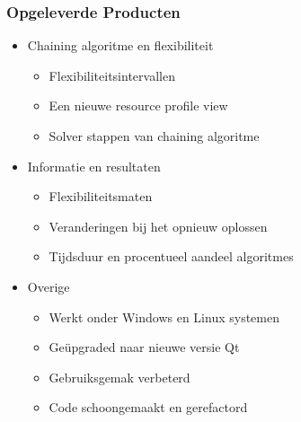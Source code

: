 \begin{frame}\frametitle{Opgeleverde Producten}
\begin{itemize}
	\item Chaining algoritme en flexibiliteit
	\begin{itemize}
		\item Flexibiliteitsintervallen
		\item Een nieuwe resource profile view
		\item Solver stappen van chaining algoritme
	\end{itemize}
	
	\item Informatie en resultaten
	\begin{itemize}
		\item Flexibiliteitsmaten
		\item Veranderingen bij het opnieuw oplossen
		\item Tijdsduur en procentueel aandeel algoritmes
	\end{itemize}
	
	\item Overige
	\begin{itemize}
		\item Werkt onder Windows en Linux systemen
		\item Ge\"upgraded naar nieuwe versie Qt
		\item Gebruiksgemak verbeterd
		\item Code schoongemaakt en gerefactord
	\end{itemize}
\end{itemize}
\end{frame}
